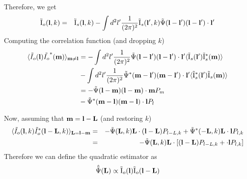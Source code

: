 \documentclass[12pt]{article}
\newcommand{\beq}{\begin{equation}}
\newcommand{\eeq}{\end{equation}}
\newcommand{\beqa}{\begin{eqnarray}}
\newcommand{\eeqa}{\end{eqnarray}}
\newcommand{\beqal}{\begin{aligned}}
\newcommand{\eeqal}{\end{aligned}}
\def\l{{\bf l}}
\def\L{{\bf L}}
\def\il{{\tilde{\rm I}}}
\numberwithin{equation}{section}
\begin{document}
Therefore, we get
\begin{eqnarray}
\il_o(\l,k) &=& \il_s(\l, k) - \int {d^2l'} \frac{1}{(2\pi)^2}\il_s(\l',k)\tilde{\Psi}(\l-\l')(\l-\l')\cdot
\l'
\end{eqnarray}
Computing the correlation function (and dropping $ k $)
\beq
\beqal
\langle \tilde I_o (\l) \tilde{I_o}^*(\textbf{m}) \rangle _{\textbf{m} \neq \textbf{l}} &= - \int {d^2 l'}  \frac{1}{(2\pi)^2}\tilde{\Psi}(\l-\l')(\l-\l')\cdot \l'  \langle \il_s(\l^\prime) \il_s^*(\textbf{m})  \rangle 
\\
& -  \int {d^2 l'}  \frac{1}{(2\pi)^2}\tilde{\Psi}^*(\textbf{m}-\l')(\textbf{m}-\l')\cdot \l'  \langle \il_s^*(\l^\prime) \il_s(\textbf{m}) \rangle
 \\
 &= -  \tilde{\Psi}(\l-\textbf{m})(\l-\textbf{m})\cdot \textbf{m}  P_m 
 \\
&  -   \tilde{\Psi}^*(\textbf{m}-\l)(\textbf{m}-\l)\cdot \l  P_l
\eeqal
\eeq

Now, assuming that $ \textbf{m} = \l- \L $ (and restoring $ k $)
\begin{eqnarray}
\langle \tilde I_o (\l,k) \tilde{I}_o^*(\l - \L, k) \rangle _{\textbf{L}  = \l - \textbf{m}} &=& -  \tilde{\Psi}(\L, k)\L\cdot (\textbf{l} - \textbf{L})  P_{l - L, k} +   \tilde{\Psi}^*(-\L, k)\L\cdot \l  P_{l, k} \\
&=& -  \tilde{\Psi}(\L, k)\L \cdot \left[(\textbf{l} - \textbf{L})  P_{l - L, k} +  \cdot \l  P_{l, k}\right] \label{eq: dodelson_correlation}
\end{eqnarray}
%
Therefore we can define the quadratic estimator as
\beqa
\hat{\tilde{\Psi}}(\L) \propto \il_o(\l) \il_o(\l - \L) \label{eq:lensing_potential_estimator_form}
\eeqa
%
\end{document}
